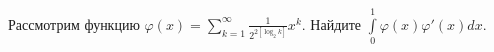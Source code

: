 \documentclass{article}
\begin{document}
Рассмотрим функцию $\varphi(x) = \sum\limits_{k=1}^\infty \frac{1}{2^{2[\log_2 k]}} x^k$. Найдите $\int\limits_0^1 \varphi(x) \varphi'(x) dx$.
\end{document}
